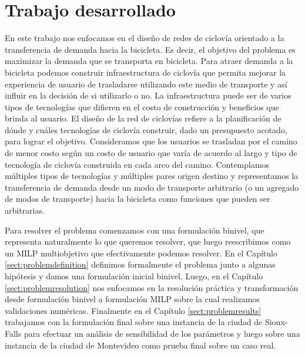   \section{Trabajo desarrollado}

  En este trabajo nos enfocamos en el diseño de redes de ciclovía orientado a la transferencia de demanda hacia la bicicleta. Es decir, el objetivo del problema es maximizar la demanda que se transporta en bicicleta. Para atraer demanda a la bicicleta podemos construir infraestructura de ciclovía que permita mejorar la experiencia de usuario de trasladarse utilizando este medio de transporte y así influir en la decisión de si utilizarlo o no. La infraestructura puede ser de varios tipos de tecnologías que difieren en el costo de construcción y beneficios que brinda al usuario. El diseño de la red de ciclovías refiere a la planificación de dónde y cuáles tecnologías de ciclovía construir, dado un presupuesto acotado, para lograr el objetivo. Consideramos que los usuarios se trasladan por el camino de menor costo según un costo de usuario que varía de acuerdo al largo y tipo de tecnología de ciclovía construida en cada arco del camino. Contemplamos múltiples tipos de tecnologías y múltiples pares origen destino y representamos la transferencia de demanda desde un modo de transporte arbitrario (o un agregado de modos de transporte) hacia la bicicleta como funciones que pueden ser arbitrarias.

  Para resolver el problema comenzamos con una formulación binivel, que representa naturalmente lo que queremos resolver, que luego reescribimos como un MILP multiobjetivo que efectivamente podemos resolver. En el Capítulo \ref{sect:problemdefinition} definimos formalmente el problema junto a algunas hipótesis y damos una formulación inicial binivel. Luego, en el Capítulo \ref{sect:problemresolution} nos enfocamos en la resolución práctica y transformación desde formulación binivel a formulación MILP sobre la cual realizamos validaciones numéricas. Finalmente en el Capítulo \ref{sect:problemresults} trabajamos con la formulación final sobre una instancia de la ciudad de Sioux-Falls para efectuar un análisis de sensibilidad de los parámetros y luego sobre una instancia de la ciudad de Montevideo como prueba final sobre un caso real.

